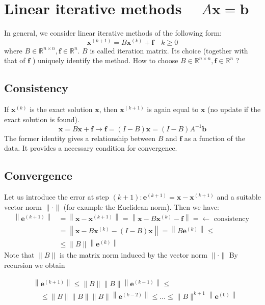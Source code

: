 \documentclass[11pt]{book}
\begin{document}
\section*{Linear iterative methods $\quad A \mathbf{x}=\mathbf{b}$}
In general, we consider linear iterative methods of the following form:
$$
\mathbf{x}^{(k+1)}=B \mathbf{x}^{(k)}+\mathbf{f} \quad k \geq 0
$$
where $B \in \mathbb{R}^{n \times n}, \mathbf{f} \in \mathbb{R}^{n}$.
$B$ is called iteration matrix. Its choice (together with that of $\mathbf{f}$ ) uniquely identify the method.
How to choose $B \in \mathbb{R}^{n \times n}, \mathbf{f} \in \mathbb{R}^{n}$ ?

\subsection*{Consistency}
If $\mathbf{x}^{(k)}$ is the exact solution $\mathbf{x}$, then $\mathbf{x}^{(k+1)}$ is again equal to $\mathbf{x}$ (no update if the exact solution is found).
$$
\boldsymbol{x}=B \boldsymbol{x}+\boldsymbol{f} \rightarrow \boldsymbol{f}=(I-B) \boldsymbol{x}=(I-B) A^{-1} \boldsymbol{b}
$$
The former identity gives a relationship between $B$ and $\mathbf{f}$ as a function of the data. It provides a necessary condition for convergence.
\subsection*{Convergence}
Let us introduce the error at step $(k+1): \mathbf{e}^{(k+1)}=\mathbf{x}-\mathbf{x}^{(k+1)}$ and a suitable vector norm $\|\cdot\|$ (for example the Euclidean norm). Then we have:
$$
\begin{aligned}
\left\|\boldsymbol{e}^{(k+1)}\right\| & =\left\|\boldsymbol{x}-\boldsymbol{x}^{(k+1)}\right\|=\left\|\boldsymbol{x}-B \boldsymbol{x}^{(k)}-\boldsymbol{f}\right\|=\longleftarrow \text { consistency } \\
& =\left\|\boldsymbol{x}-B \boldsymbol{x}^{(k)}-(I-B) \boldsymbol{x}\right\|=\left\|B \boldsymbol{e}^{(k)}\right\| \leq \\
& \leq\|B\|\left\|\boldsymbol{e}^{(k)}\right\|
\end{aligned}
$$
Note that $\|B\|$ is the matrix norm induced by the vector norm $\|\cdot\|$ By recursion we obtain

$$
\begin{aligned}
& \left\|\boldsymbol{e}^{(k+1)}\right\| \leq\|B\|\|B\|\left\|\boldsymbol{e}^{(k-1)}\right\| \leq \\
& \quad \leq\|B\|\|B\|\|B\|\left\|\boldsymbol{e}^{(k-2)}\right\| \leq \ldots \leq\|B\|^{k+1}\left\|\boldsymbol{e}^{(0)}\right\|
\end{aligned}
$$
\end{document}
